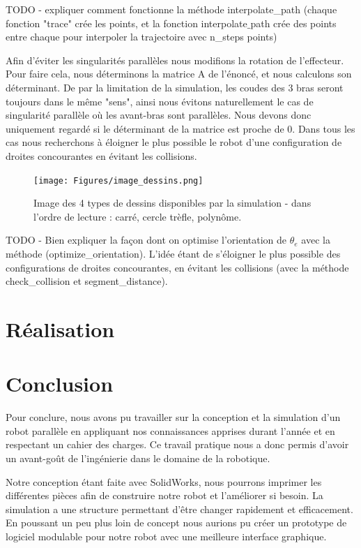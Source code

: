 \documentclass[a4paper, 11pt]{report}
\begin{document}
TODO - expliquer comment fonctionne la méthode interpolate\_path (chaque fonction "trace" crée les points, et la fonction interpolate$\_$path crée des points entre chaque pour interpoler la trajectoire avec n\_steps points)

Afin d'éviter les singularités parallèles nous modifions la rotation de l'effecteur. Pour faire cela, nous déterminons la matrice A de l'énoncé, et nous calculons son déterminant. De par la limitation de la simulation, les coudes des 3 bras seront toujours dans le même "sens", ainsi nous évitons naturellement le cas de singularité parallèle où les avant-bras sont parallèles. Nous devons donc uniquement regardé si le déterminant de la matrice est proche de 0. Dans tous les cas nous recherchons à éloigner le plus possible le robot d'une configuration de droites concourantes en évitant les collisions.

\begin{figure}[!htb]
    \centering
    \texttt{[image: Figures/image\_dessins.png]}
    \caption{Image des 4 types de dessins disponibles par la simulation - dans l'ordre de lecture : carré, cercle trèfle, polynôme.}
    \label{fig:dessins}
\end{figure}

TODO - Bien expliquer la façon dont on optimise l'orientation de $\theta_e$ avec la méthode  (optimize\_orientation). L'idée étant de s'éloigner le plus possible des configurations de droites concourantes, en évitant les collisions (avec la méthode check\_collision et segment\_distance).
\section{Réalisation}

\section*{Conclusion}
Pour conclure, nous avons pu travailler sur la conception et la simulation d'un robot parallèle en appliquant nos connaissances apprises durant l'année et en respectant un cahier des charges. Ce travail pratique nous a donc permis d'avoir un avant-goût de l'ingénierie dans le domaine de la robotique.

Notre conception étant faite avec SolidWorks, nous pourrons imprimer les différentes pièces afin de construire notre robot et l'améliorer si besoin. La simulation a une structure permettant d'être changer rapidement et efficacement. En poussant un peu plus loin de concept nous aurions pu créer un prototype de logiciel modulable pour notre robot avec une meilleure interface graphique. 
\end{document}
